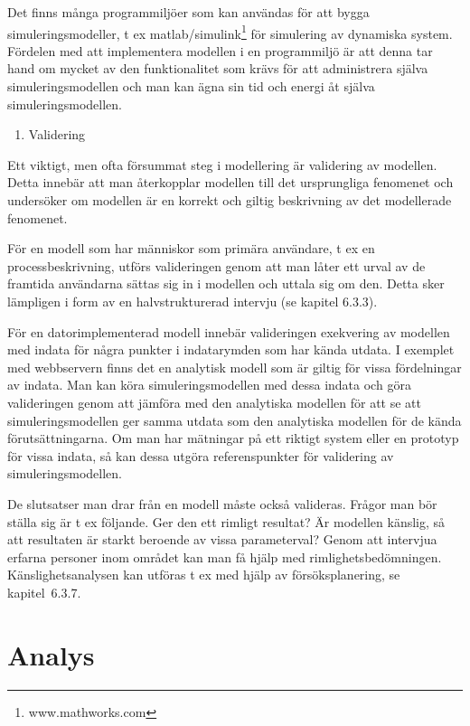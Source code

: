 Det finns många programmiljöer som kan användas för att bygga
simuleringsmodeller, t ex matlab/simulink\footnote{www.mathworks.com}
för simulering av dynamiska system. Fördelen med att implementera
modellen i en programmiljö är att denna tar hand om mycket av den
funktionalitet som krävs för att administrera själva simuleringsmodellen
och man kan ägna sin tid och energi åt själva simuleringsmodellen.

\begin{enumerate}
\def\labelenumi{\arabic{enumi}.}
\item
  Validering
\end{enumerate}

Ett viktigt, men ofta försummat steg i modellering är validering av
modellen. Detta innebär att man återkopplar modellen till det
ursprungliga fenomenet och undersöker om modellen är en korrekt och
giltig beskrivning av det modellerade fenomenet.

För en modell som har människor som primära användare, t ex en
processbeskrivning, utförs valideringen genom att man låter ett urval av
de framtida användarna sättas sig in i modellen och uttala sig om den.
Detta sker lämpligen i form av en halvstrukturerad intervju (se kapitel
6.3.3).

För en datorimplementerad modell innebär valideringen exekvering av
modellen med indata för några punkter i indatarymden som har kända
utdata. I exemplet med webbservern finns det en analytisk modell som är
giltig för vissa fördelningar av indata. Man kan köra
simuleringsmodellen med dessa indata och göra valideringen genom att
jämföra med den analytiska modellen för att se att simuleringsmodellen
ger samma utdata som den analytiska modellen för de kända
förutsättningarna. Om man har mätningar på ett riktigt system eller en
prototyp för vissa indata, så kan dessa utgöra referenspunkter för
validering av simuleringsmodellen.

De slutsatser man drar från en modell måste också valideras. Frågor man
bör ställa sig är t ex följande. Ger den ett rimligt resultat? Är
modellen känslig, så att resultaten är starkt beroende av vissa
parameterval? Genom att intervjua erfarna personer inom området kan man
få hjälp med rimlighetsbedömningen. Känslighetsanalysen kan utföras t ex
med hjälp av försöksplanering, se kapitel~6.3.7.

\section{Analys}\label{analys}

